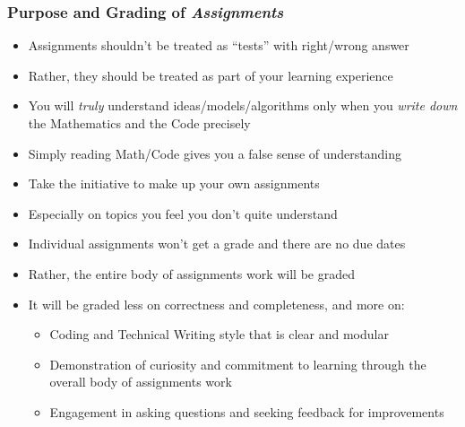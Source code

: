 \documentclass[handout]{beamer}
\begin{document}
\begin{frame}
\frametitle{Purpose and Grading of {\em Assignments}}
\pause
\begin{itemize}[<+->]
\item Assignments shouldn't be treated as ``tests'' with right/wrong answer
\item Rather, they should be treated as part of your learning experience
\item You will {\em truly} understand ideas/models/algorithms only when you {\em write down} the Mathematics and the Code precisely
\item Simply reading Math/Code gives you a false sense of understanding
\item Take the initiative to make up your own assignments
\item Especially on topics you feel you don't quite understand
\item Individual assignments won't get a grade and there are no due dates
\item Rather, the entire body of assignments work will be graded
\item It will be graded less on correctness and completeness, and more on:
\begin{itemize}
\item Coding and Technical Writing style that is clear and modular
\item Demonstration of curiosity and commitment to learning through the overall body of assignments work
\item Engagement in asking questions and seeking feedback for improvements
\end{itemize}
\end{itemize}
\end{frame}
\end{document}
